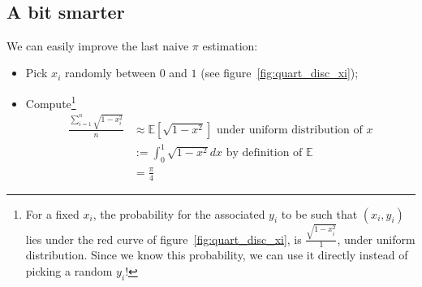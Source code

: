 \documentclass[11pt,a4paper]{scrartcl} %
\theoremstyle{definition}
\newcommand{\E}{\mathbb{E}}
\begin{document}
\begin{figure}[h!]%
    \centering
    ~
		\\
		\caption{} 
		\label{fig:compute_pi}
\end{figure}

\subsection{A bit smarter}

We can easily improve the last naive $\pi$ estimation:
\begin{itemize}
	\item Pick $x_i$ randomly between $0$ and $1$ (see figure~\ref{fig:quart_disc_xi});
	\item Compute\footnote{For a fixed $x_i$, the probability for the associated $y_i$ to be such that $(x_i,y_i)$ lies under the red curve of figure~\ref{fig:quart_disc_xi}, is $\frac{\sqrt{1-x_i^2}}{1}$, under uniform distribution. Since we know this probability, we can use it directly instead of picking a random $y_i$!}
	\begin{align*}
	\frac{\sum_{i=1}^n{\sqrt{1-x_i^2}}}{n}&\approx \E\left[\sqrt{1-x^2}\right] \text{  under uniform distribution of }x\\
	&:=\int_{0}^1{\sqrt{1-x^2} dx} \text{  by definition of } \E\\
	&=\frac{\pi}{4}
	\end{align*}
\end{itemize}
\end{document}
